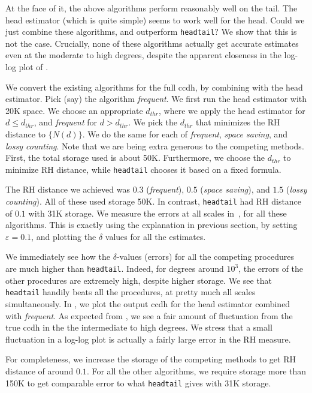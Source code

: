 \documentclass[11pt]{article}
\theoremstyle{definition}
\def\eps{\varepsilon}
\newcommand{\degdist}{{\tt headtail}}
\begin{document}
At the face of it, the above algorithms perform reasonably well on the tail. The head estimator
(which is quite simple) seems to work well for the head. Could we just combine these algorithms,
and outperform \degdist? We show that this is not the case. Crucially,
none of these algorithms actually get accurate estimates even
at the moderate to high degrees, despite the apparent closeness in the log-log plot of .

We convert the existing algorithms for the full ccdh, by combining with the head estimator.
Pick (say) the algorithm \emph{frequent}.
We first run the head estimator with 20K space. We choose an appropriate $d_{thr}$, where we apply the head
estimator for $d \leq d_{thr}$, and \emph{frequent} for $d > d_{thr}$.
We pick the $d_{thr}$ that minimizes the RH distance to $\{N(d)\}$.
We do the same for each of \emph{frequent}, \emph{space saving}, and \emph{lossy counting}.
Note that we are being extra generous to the competing methods. First, the total
storage used is about 50K. Furthermore, we choose the $d_{thr}$ to minimize RH distance,
while \degdist{} chooses it based on a fixed formula.

The RH distance we achieved was $0.3$ (\emph{frequent}), $0.5$ (\emph{space saving}), and $1.5$ (\emph{lossy counting}).
All of these used storage 50K. In contrast, \degdist{} had RH distance of $0.1$ with 31K storage.
We measure the errors at all scales in~, for all these algorithms. This is exactly
using the explanation in previous section, by setting $\eps = 0.1$, and plotting the $\delta$
values for all the estimates.

We immediately see how the $\delta$-values (errors) for all the competing procedures are much higher than \degdist.
Indeed, for degrees around $10^3$, the errors of the other procedures are extremely high, despite higher storage.
We see that \degdist{} handily beats all the procedures, at pretty much all scales simultaneously.
In , we plot the output ccdh for the head estimator combined with \emph{frequent}.
As expected from , we see a fair amount of fluctuation from the true ccdh in the the intermediate
to high degrees. We stress that a small fluctuation in a log-log plot is actually a fairly large error
in the RH measure.

For completeness, we increase the storage of the competing methods to get RH distance of around $0.1$.
For all the other algorithms, we require storage more than 150K to get comparable
error to what \degdist{} gives with 31K storage.
\end{document}
